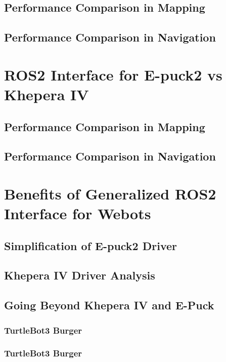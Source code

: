 \subsection{Performance Comparison in Mapping}
\subsection{Performance Comparison in Navigation}

\section{ROS2 Interface for E-puck2 vs Khepera IV}
\subsection{Performance Comparison in Mapping}
\subsection{Performance Comparison in Navigation}

\section{Benefits of Generalized ROS2 Interface for Webots}
\subsection{Simplification of E-puck2 Driver}
\subsection{Khepera IV Driver Analysis}
\subsection{Going Beyond Khepera IV and E-Puck}
\subsubsection{TurtleBot3 Burger}
\subsubsection{TurtleBot3 Burger}
